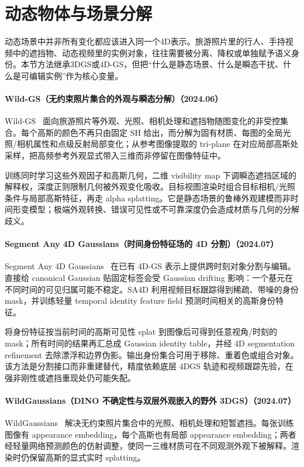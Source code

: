\section{动态物体与场景分解}

动态场景中并非所有变化都应该进入同一个4D表示。旅游照片里的行人、手持视频中的遮挡物、动态视频里的实例对象，往往需要被分离、降权或单独赋予语义身份。本节方法继承3DGS或4D-GS，但把“什么是静态场景、什么是瞬态干扰、什么是可编辑实例”作为核心变量。
\paragraph{Wild-GS（无约束照片集合的外观与瞬态分解）（2024.06）}
Wild-GS~\cite{2406_10373} 面向旅游照片等外观、光照、相机处理和遮挡物随图变化的非受控集合。每个高斯的颜色不再只由固定 SH 给出，而分解为固有材质、每图的全局光照/相机属性和点级反射局部变化；从参考图像提取的 tri-plane 在对应局部高斯处采样，把高频参考外观显式带入三维而非停留在图像特征中。

训练同时学习这些外观因子和高斯几何，二维 visibility map 下调瞬态遮挡区域的解释权，深度正则限制几何被外观变化吸收。目标视图渲染时组合目标相机/光照条件与局部高斯特征，再走 alpha splatting。它是静态场景的鲁棒外观建模而非时间形变模型；极端外观转换、错误可见性或不可靠深度仍会造成材质与几何的分解歧义。

\paragraph{Segment Any 4D Gaussians（时间身份特征场的 4D 分割）（2024.07）}
Segment Any 4D Gaussians~\cite{2407_04504} 在已有 4D-GS 表示上提供跨时刻对象分割与编辑。直接给 canonical Gaussian 贴固定标签会受 Gaussian drifting 影响：一个基元在不同时间的可见归属可能不稳定。SA4D 利用视频目标跟踪得到稀疏、带噪的身份 mask，并训练轻量 temporal identity feature field 预测时间相关的高斯身份特征。

将身份特征按当前时间的高斯可见性 splat 到图像后可得到任意视角/时刻的 mask；所有时间的结果再汇总成 Gaussian identity table，并经 4D segmentation refinement 去除漂浮和边界伪影。输出身份集合可用于移除、重着色或组合对象。该方法是分割接口而非重建替代，精度依赖底层 4DGS 轨迹和视频跟踪先验，在强非刚性或遮挡重现处仍可能失配。

\paragraph{WildGaussians（DINO 不确定性与双层外观嵌入的野外 3DGS）（2024.07）}
WildGaussians~\cite{2407_08447} 解决无约束照片集合中的光照、相机处理和短暂遮挡。每张训练图像有 appearance embedding，每个高斯也有局部 appearance embedding；两者经轻量网络预测颜色的仿射调整，使同一三维材质可在不同观测外观下被解释。渲染时仍保留高斯的显式实时 splatting。

